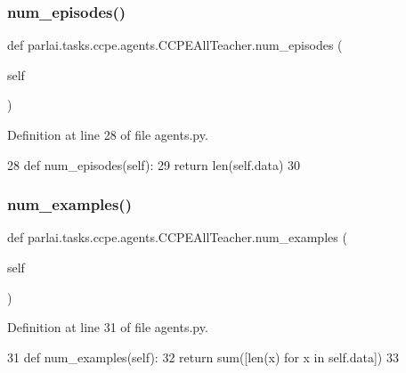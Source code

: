 \subsubsection{\texorpdfstring{num\+\_\+episodes()}{num\_episodes()}}
{\footnotesize\ttfamily def parlai.\+tasks.\+ccpe.\+agents.\+C\+C\+P\+E\+All\+Teacher.\+num\+\_\+episodes (\begin{DoxyParamCaption}\item[{}]{self }\end{DoxyParamCaption})}



Definition at line 28 of file agents.\+py.


\begin{DoxyCode}
28     \textcolor{keyword}{def }num\_episodes(self):
29         \textcolor{keywordflow}{return} len(self.data)
30 
\end{DoxyCode}
\mbox{\label{classparlai_1_1tasks_1_1ccpe_1_1agents_1_1CCPEAllTeacher_aa0cd16c6ebf2fa6bc0c8ad2e449445de}} 
\subsubsection{\texorpdfstring{num\+\_\+examples()}{num\_examples()}}
{\footnotesize\ttfamily def parlai.\+tasks.\+ccpe.\+agents.\+C\+C\+P\+E\+All\+Teacher.\+num\+\_\+examples (\begin{DoxyParamCaption}\item[{}]{self }\end{DoxyParamCaption})}



Definition at line 31 of file agents.\+py.


\begin{DoxyCode}
31     \textcolor{keyword}{def }num\_examples(self):
32         \textcolor{keywordflow}{return} sum([len(x) \textcolor{keywordflow}{for} x \textcolor{keywordflow}{in} self.data])
33 
\end{DoxyCode}
\mbox{\label{classparlai_1_1tasks_1_1ccpe_1_1agents_1_1CCPEAllTeacher_ab1b9d65d88c950391175472d72694f80}} 
